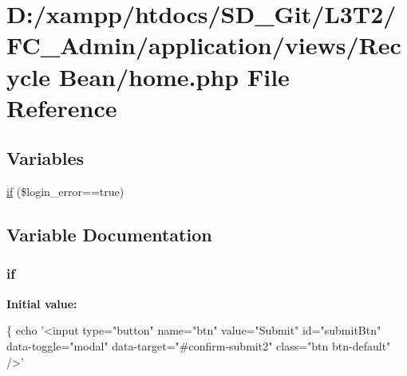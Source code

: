 \hypertarget{views_2_recycle_01_bean_2home_8php}{}\section{D\+:/xampp/htdocs/\+S\+D\+\_\+\+Git/\+L3\+T2/\+F\+C\+\_\+\+Admin/application/views/\+Recycle Bean/home.php File Reference}
\label{views_2_recycle_01_bean_2home_8php}
\subsection*{Variables}
\begin{DoxyCompactItemize}
\item 
\hyperlink{views_2_recycle_01_bean_2home_8php_a61054df540ac9d6344e5912450abd983}{if} (\$login\+\_\+error==true)
\end{DoxyCompactItemize}


\subsection{Variable Documentation}
\hypertarget{views_2_recycle_01_bean_2home_8php_a61054df540ac9d6344e5912450abd983}{}
\subsubsection[{if}]{\setlength{\rightskip}{0pt plus 5cm}if}\label{views_2_recycle_01_bean_2home_8php_a61054df540ac9d6344e5912450abd983}
{\bfseries Initial value\+:}
\begin{DoxyCode}
\{
            echo \textcolor{stringliteral}{'<input type="button" name="btn" value="Submit" id="submitBtn" data-toggle="modal"
       data-target="#confirm-submit2" class="btn btn-default" />'}
\end{DoxyCode}
